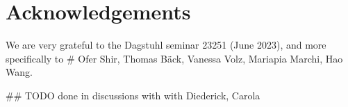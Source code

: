 
\section*{Acknowledgements}
We are very grateful to the Dagstuhl seminar 23251 (June 2023), and more specifically to 
# Ofer Shir, Thomas B\"ack, Vanessa Volz, Mariapia Marchi, Hao Wang.

## TODO  done in discussions with with Diederick, Carola



